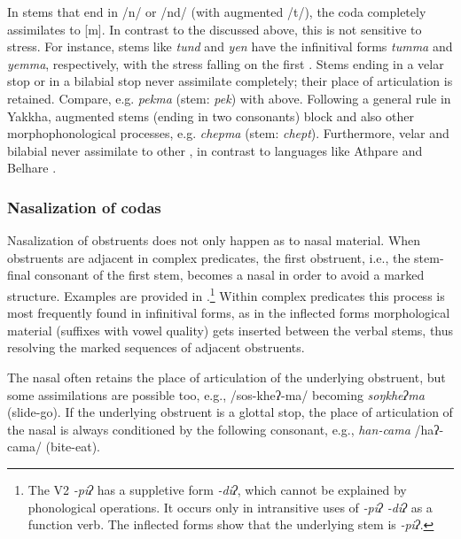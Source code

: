 In stems that end in /n/ or /nd/ (with augmented /t/), the coda completely assimilates to [m]. In contrast to the  discussed above, this  is not sensitive to stress. For instance, stems like \emph{tund}  and \emph{yen}  have the infinitival forms \emph{tumma} and \emph{yemma}, respectively, with the stress falling on the first . Stems ending in a velar stop or in a bilabial stop never assimilate completely; their place of articulation is retained. Compare, e.g. \emph{pekma}  (stem: \emph{pek}) with \Last[b] above. Following a general rule in Yakkha, augmented stems (ending in two consonants) block  and also other morphophonological processes, e.g. \emph{chepma}  (stem: \emph{chept}). Furthermore, velar and bilabial  never assimilate to other , in contrast to languages like Athpare and  Belhare \citep{Ebert1997A-grammar, Bickel2003Belhare}.


\subsubsection{Nasalization of codas}\label{nas-cod}

Nasalization of obstruents does not only happen as  to nasal material. When obstruents are adjacent in complex predicates, the first obstruent, i.e., the stem-final consonant of the first stem, becomes a nasal in order to avoid a marked structure. Examples are provided in  .\footnote{The V2 \emph{-piʔ} has a suppletive form \emph{-diʔ}, which cannot be explained by phonological operations. It occurs only in intransitive uses of \emph{-piʔ \ti -diʔ}  as a function verb. The inflected forms show that the underlying stem is \emph{-piʔ}.} Within complex predicates this process is most frequently found in infinitival forms, as in the inflected forms morphological material (suffixes with vowel quality) gets inserted between the verbal stems, thus resolving the marked sequences of adjacent obstruents.

The nasal often retains the place of articulation of the underlying obstruent, but some assimilations are possible too, e.g., /sos-kheʔ-ma/ becoming \emph{soŋkheʔma}  (slide-go). If the underlying obstruent is a glottal stop, the place of articulation of the nasal is always conditioned by the following consonant, e.g., \emph{han-cama} /haʔ-cama/  (bite-eat). 

